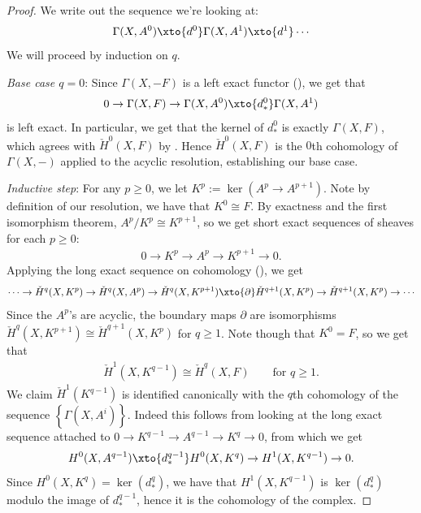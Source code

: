 \documentclass[11pt]{book}
\begin{document}
\begin{proof} We write out the sequence we're looking at:
\begin{align*}
    \Gamma(X,A^0) \xto{d^0} \Gamma(X,A^1) \xto{d^1} \cdots
\end{align*}
We will proceed by induction on $q$. 

\emph{Base case $q=0$}: Since $\Gamma(X,-F)$ is a left exact functor (), we get that
\begin{align*}
    0 \to \Gamma(X,F) \to \Gamma(X,A^0) \xto{d^0_\ast} \Gamma(X,A^1)
\end{align*}
is left exact. In particular, we get that the kernel of $d^0_\ast$ is exactly $\Gamma(X,F)$, which agrees with $\check{H}^0(X,F)$ by . Hence $\check{H}^0(X,F)$ is the $0$th cohomology of $\Gamma(X,-)$ applied to the acyclic resolution, establishing our base case.

\emph{Inductive step}: For any $p\ge0$, we let $K^p := \ker(A^p \to A^{p+1})$. Note by definition of our resolution, we have that $K^0\cong F$. By exactness and the first isomorphism theorem, $A^p/K^p \cong K^{p+1}$, so we get short exact sequences of sheaves for each $p\ge 0$:
\begin{align*}
    0 \to K^p \to A^p \to K^{p+1}\to 0.
\end{align*}
Applying the long exact sequence on cohomology (), we get
\begin{align*}
    \cdots \to \check{H}^q(X,K^p) \to \check{H}^q(X,A^p) \to \check{H}^q(X,K^{p+1})\xto{\partial} \check{H}^{q+1}(X,K^p) \to \check{H}^{q+1}(X,K^p) \to \cdots
\end{align*}
Since the $A^p$'s are acyclic, the boundary maps $\partial$ are isomorphisms $\check{H}^q(X,K^{p+1})\cong \check{H}^{q+1}(X,K^p)$ for $q\ge 1$. Note though that $K^0 = F$, so we get that
\begin{align*}
    \check{H}^1(X,K^{q-1}) \cong \check{H}^q(X,F) \quad\quad \text{for }q\ge1.
\end{align*}
We claim $\check{H}^1(K^{q-1})$ is identified canonically with the $q$th cohomology of the sequence $\left\{ \Gamma(X,A^i) \right\}$. Indeed this follows from looking at the long exact sequence attached to $0 \to K^{q-1} \to A^{q-1}\to K^q \to 0$, from which we get
\begin{align*}
    H^0(X,A^{q-1}) \xto{d^{q-1}_\ast} H^0(X,K^q) \to H^1(X,K^{q-1}) \to 0.
\end{align*}
Since $H^0(X,K^q) = \ker(d^q_\ast)$, we have that $H^1(X,K^{q-1})$ is $\ker(d^q_\ast)$ modulo the image of $d^{q-1}_\ast$, hence it is the cohomology of the complex.
\end{proof}
\end{document}
